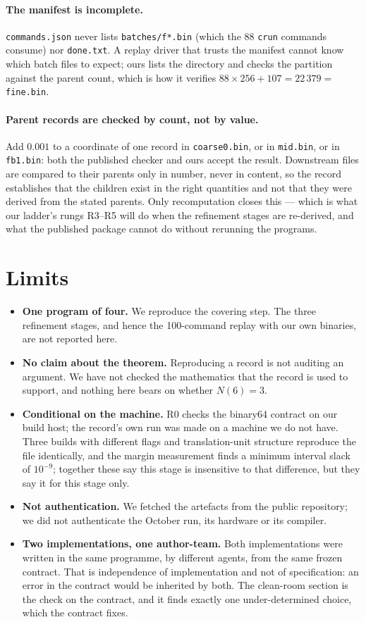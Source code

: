 \documentclass[11pt,a4paper]{article}
\newcommand{\code}[1]{\texttt{\small #1}}
\begin{document}
\paragraph{The manifest is incomplete.} \code{commands.json} never lists \code{batches/f*.bin} (which
the 88 \code{crun} commands consume) nor \code{done.txt}. A replay driver that trusts the manifest
cannot know which batch files to expect; ours lists the directory and checks the partition against
the parent count, which is how it verifies $88\times256+107=22\,379=$ \code{fine.bin}.

\paragraph{Parent records are checked by count, not by value.} Add $0.001$ to a coordinate of one
record in \code{coarse0.bin}, or in \code{mid.bin}, or in \code{fb1.bin}: both the published checker
and ours accept the result. Downstream files are compared to their parents only in number, never in
content, so the record establishes that the children exist in the right quantities and not that they
were derived from the stated parents. Only recomputation closes this --- which is what our ladder's
rungs R3--R5 will do when the refinement stages are re-derived, and what the published package cannot
do without rerunning the programs.

\section{Limits}\label{sec:limits}

\begin{itemize}
\item \textbf{One program of four.} We reproduce the covering step. The three refinement stages, and
hence the 100-command replay with our own binaries, are not reported here.
\item \textbf{No claim about the theorem.} Reproducing a record is not auditing an argument. We have
not checked the mathematics that the record is used to support, and nothing here bears on whether
$N(6)=3$.
\item \textbf{Conditional on the machine.} R0 checks the binary64 contract on our build host; the
record's own run was made on a machine we do not have. Three builds with different flags and
translation-unit structure reproduce the file identically, and the margin measurement finds a minimum
interval slack of $10^{-9}$; together these say this stage is insensitive to that difference, but they
say it for this stage only.
\item \textbf{Not authentication.} We fetched the artefacts from the public repository; we did not
authenticate the October run, its hardware or its compiler.
\item \textbf{Two implementations, one author-team.} Both implementations were written in the same
programme, by different agents, from the same frozen contract. That is independence of implementation
and not of specification: an error in the contract would be inherited by both. The clean-room section
is the check on the contract, and it finds exactly one under-determined choice, which the contract
fixes.
\end{itemize}
\end{document}
